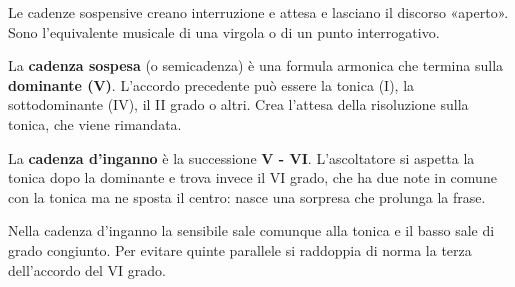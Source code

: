 Le cadenze sospensive creano interruzione e attesa e lasciano il discorso «aperto». Sono l'equivalente musicale di una virgola o di un punto interrogativo.

\begin{definizione}
	\label{def:cadenza_sospesa}
	La \textbf{cadenza sospesa} (o semicadenza) è una formula armonica che termina sulla \textbf{dominante (V)}. L'accordo precedente può essere la tonica (I), la sottodominante (IV), il II grado o altri. Crea l'attesa della risoluzione sulla tonica, che viene rimandata.
\end{definizione}

\begin{esempio}
	\label{ex:cadenza_sospesa}
\end{esempio}

\begin{definizione}
	\label{def:cadenza_inganno}
	La \textbf{cadenza d'inganno} è la successione \textbf{V - VI}. L'ascoltatore si aspetta la tonica dopo la dominante e trova invece il VI grado, che ha due note in comune con la tonica ma ne sposta il centro: nasce una sorpresa che prolunga la frase.
\end{definizione}

Nella cadenza d'inganno la sensibile sale comunque alla tonica e il basso sale di grado congiunto. Per evitare quinte parallele si raddoppia di norma la terza dell'accordo del VI grado.

\begin{esempio}
	\label{ex:cadenza_inganno}
\end{esempio}
